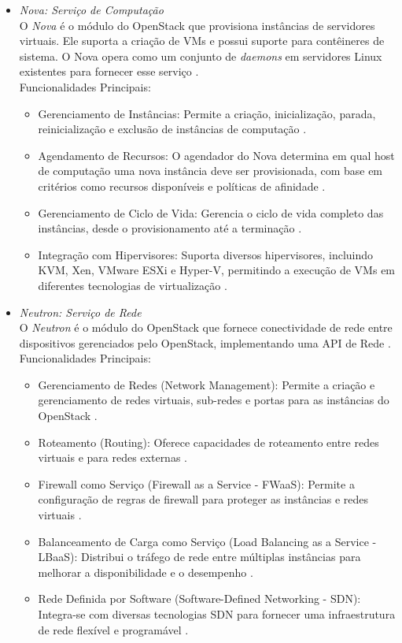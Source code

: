 \begin{itemize}
\begin{itemize}
    \item \emph{Nova: Serviço de Computação}\\
    O \textit{Nova} é o módulo do OpenStack que provisiona instâncias de servidores virtuais. Ele suporta a criação de VMs e possui suporte para contêineres de sistema. O Nova opera como um conjunto de \textit{daemons} em servidores Linux existentes para fornecer esse serviço \cite{openstacknova}.\\
    Funcionalidades Principais:
    \begin{itemize}
        \item Gerenciamento de Instâncias: Permite a criação, inicialização, parada, reinicialização e exclusão de instâncias de computação \cite{openstacknova}.
        \item Agendamento de Recursos: O agendador do Nova determina em qual host de computação uma nova instância deve ser provisionada, com base em critérios como recursos disponíveis e políticas de afinidade \cite{openstacknova}.
        \item Gerenciamento de Ciclo de Vida: Gerencia o ciclo de vida completo das instâncias, desde o provisionamento até a terminação \cite{openstacknova}.
        \item Integração com Hipervisores: Suporta diversos hipervisores, incluindo KVM, Xen, VMware ESXi e Hyper-V, permitindo a execução de VMs em diferentes tecnologias de virtualização \cite{openstacknova}.
    \end{itemize}

    \item \emph{Neutron: Serviço de Rede}\\
    O \textit{Neutron} é o módulo do OpenStack que fornece conectividade de rede entre dispositivos gerenciados pelo OpenStack, implementando uma API de Rede \cite{openstackneutron}.\\
    Funcionalidades Principais:
    \begin{itemize}
        \item Gerenciamento de Redes (Network Management): Permite a criação e gerenciamento de redes virtuais, sub-redes e portas para as instâncias do OpenStack \cite{openstackneutron}.
        \item Roteamento (Routing): Oferece capacidades de roteamento entre redes virtuais e para redes externas \cite{openstackneutron}.
        \item Firewall como Serviço (Firewall as a Service - FWaaS): Permite a configuração de regras de firewall para proteger as instâncias e redes virtuais \cite{openstackneutron}.
        \item Balanceamento de Carga como Serviço (Load Balancing as a Service - LBaaS): Distribui o tráfego de rede entre múltiplas instâncias para melhorar a disponibilidade e o desempenho \cite{openstackneutron}.
        \item Rede Definida por Software (Software-Defined Networking - SDN): Integra-se com diversas tecnologias SDN para fornecer uma infraestrutura de rede flexível e programável \cite{openstackneutron}.
    \end{itemize}


\end{itemize}
\end{itemize}
